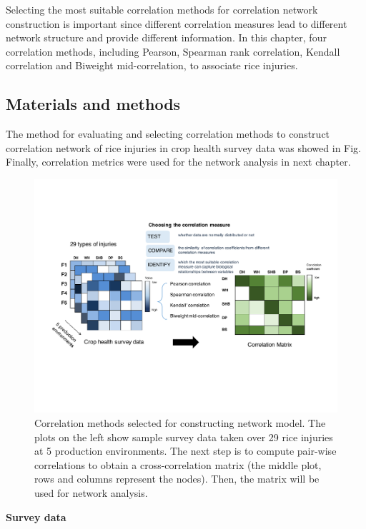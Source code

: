Selecting the most suitable correlation methods for correlation network construction is important since different correlation measures lead to different network structure and provide different information. In this chapter, four correlation methods, including Pearson, Spearman rank correlation, Kendall correlation \citep{Prokhorov_2001_Kendall} and Biweight mid-correlation, to associate rice injuries. 
 

\subsection{Materials and methods}

The method for evaluating and selecting correlation methods to construct correlation network of rice injuries in crop health survey data was showed in Fig. Finally, correlation metrics were used for the network analysis in next chapter.

\begin{figure}
    \centering
     \includegraphics[width = 1\textwidth]{figures/pipeline1.pdf}
    \caption{Correlation methods selected for constructing network model. The plots on the left show sample survey data taken over 29 rice injuries at 5 production environments. The next step is to compute pair-wise correlations to obtain a cross-correlation matrix (the middle plot, rows and columns represent the nodes). Then, the matrix will be used for network analysis.}
    \label{fig:pipeline1}
\end{figure}

\textbf{Survey data}

